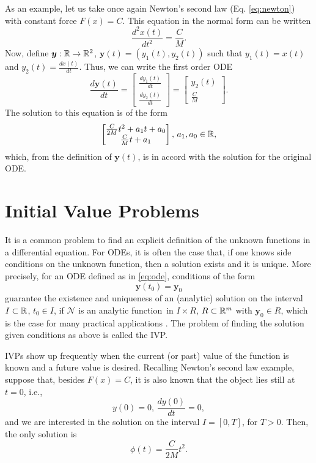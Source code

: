 As an example, let us take once again Newton's second law (Eq. \eqref{eq:newton}) with constant force $F(x)=C$.
This equation in the normal form can be written
\[
    \frac{d^2 x\left( t \right) }{dt^2} = \frac{C}{M}
.\] 
Now, define $\bm{y}:\mathbb{R}\to \mathbb{R}^2$, $\bm{y}(t) = \left( y_1\left( t \right) ,y_2\left( t \right)  \right) $ such that $y_1(t) = x(t)$ and $y_2(t)=\frac{d x(t)}{dt}$. 
Thus, we can write the first order \gls{ODE}
\[
    \frac{d \bm{y}\left( t \right) }{dt} = \begin{bmatrix} \frac{d y_1\left( t \right) }{dt} \\ \frac{d y_2\left( t \right) }{dt} \end{bmatrix} = \begin{bmatrix} y_2(t) \\ \frac{C}{M} \end{bmatrix} 
.\]
The solution to this equation is of the form
\[
    \begin{bmatrix} \frac{C}{2M}t^2 +a_1t + a_0 \\ \frac{C}{M}t + a_1 \end{bmatrix},\, a_1,a_0 \in \mathbb{R}
,\]
which, from the definition of $\bm{y}(t)$, is in accord with the solution for the original ODE.

\section{Initial Value Problems}

It is a common problem to find an explicit definition of the unknown functions in a differential equation.
For \gls{ODE}s, it is often the case that, if one knows side conditions on the unknown function, then a solution exists and it is unique.
More precisely, for an \gls{ODE} defined as in \eqref{eq:ode}, conditions of the form \[
   \bm{y}\left( t_0 \right) =\bm{y}_0
\] guarantee the existence and uniqueness of an (analytic) solution on the interval $I\subset \mathbb{R}$, $t_0\in I$, if $\mathcal{N}$ is an analytic function\footnotemark\, in $I\times R$, $R\subset \mathbb{R}^m$ with $\bm{y}_0\in R$, which is the case for many practical applications \cite{iserles_first_2008}.
The problem of finding the solution given conditions as above is called the \gls{IVP}.

\glspl{IVP} show up frequently when the current (or past) value of the function is known and a future value is desired.
Recalling Newton's second law example, suppose that, besides $F(x)=C$, it is also known that the object lies still at $t=0$, i.e., \[
y(0) = 0,\,\frac{d y(0)}{dt}=0
,\] and we are interested in the solution on the interval $I=\left[ 0,T \right] $, for $T>0$. Then, the only solution is \[
    \phi\left( t \right) = \frac{C}{2M}t^2
.\] 

